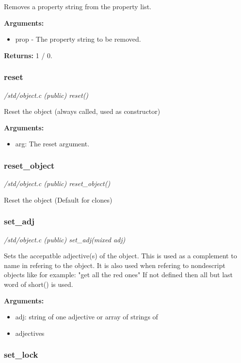 Removes a property string from the property list.

{\bf Arguments:}
\begin{itemize}
\item     prop - The property string to be removed.
\end{itemize}

{\bf Returns:}        1 / 0.


\subsubsection{reset}

{\em /std/object.c (public) reset()}

Reset the object (always called, used as constructor)

{\bf Arguments:}
\begin{itemize}
\item     arg: The reset argument.
\end{itemize}


\subsubsection{reset\_object}

{\em /std/object.c (public) reset\_object()}

Reset the object (Default for clones)


\subsubsection{set\_adj}

{\em /std/object.c (public) set\_adj(mixed adj)}

Sets the accepatble adjective(s) of the object.
This is used as a complement to name in refering to the
object. It is also used when refering to nondescript objects
like for example: "get all the red ones"
If not defined then all but last word of short() is used.

{\bf Arguments:}
\begin{itemize}
\item     adj: string of one adjective or array of strings of
\item adjectives
\end{itemize}


\subsubsection{set\_lock}

